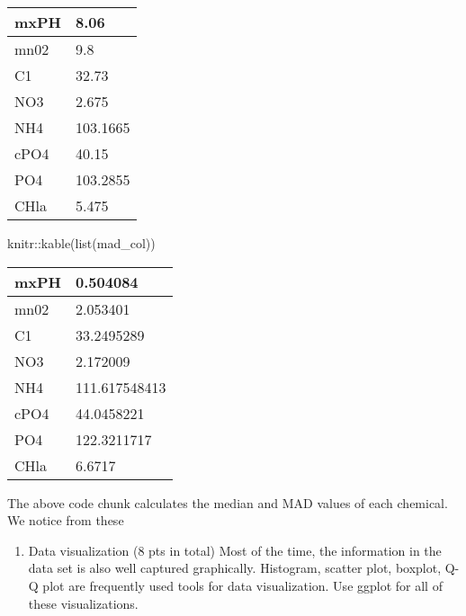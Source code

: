 \documentclass[
]{article}
\newenvironment{Shaded}{\begin{snugshade}}{\end{snugshade}}
\newcommand{\FunctionTok}[1]{\textcolor[rgb]{0.00,0.00,0.00}{#1}}
\newcommand{\NormalTok}[1]{#1}
\newcommand{\SpecialCharTok}[1]{\textcolor[rgb]{0.00,0.00,0.00}{#1}}
\providecommand{\tightlist}{%
  \setlength{\itemsep}{0pt}\setlength{\parskip}{0pt}}
\begin{document}
\begin{table}

\centering
\begin{tabular}[t]{l|l}
\hline
mxPH & 8.06\\
\hline
mn02 & 9.8\\
\hline
C1 & 32.73\\
\hline
NO3 & 2.675\\
\hline
NH4 & 103.1665\\
\hline
cPO4 & 40.15\\
\hline
PO4 & 103.2855\\
\hline
CHla & 5.475\\
\hline
\end{tabular}
\end{table}

\begin{Shaded}
\begin{Highlighting}[]
\NormalTok{knitr}\SpecialCharTok{::}\FunctionTok{kable}\NormalTok{(}\FunctionTok{list}\NormalTok{(mad\_col))}
\end{Highlighting}
\end{Shaded}

\begin{table}

\centering
\begin{tabular}[t]{l|l}
\hline
mxPH & 0.504084\\
\hline
mn02 & 2.053401\\
\hline
C1 & 33.2495289\\
\hline
NO3 & 2.172009\\
\hline
NH4 & 111.617548413\\
\hline
cPO4 & 44.0458221\\
\hline
PO4 & 122.3211717\\
\hline
CHla & 6.6717\\
\hline
\end{tabular}
\end{table}

The above code chunk calculates the median and MAD values of each
chemical. We notice from these

\begin{enumerate}
\def\labelenumi{\arabic{enumi}.}
\setcounter{enumi}{1}
\tightlist
\item
  Data visualization (8 pts in total) Most of the time, the information
  in the data set is also well captured graphically. Histogram, scatter
  plot, boxplot, Q-Q plot are frequently used tools for data
  visualization. Use ggplot for all of these visualizations.
\end{enumerate}
\end{document}

